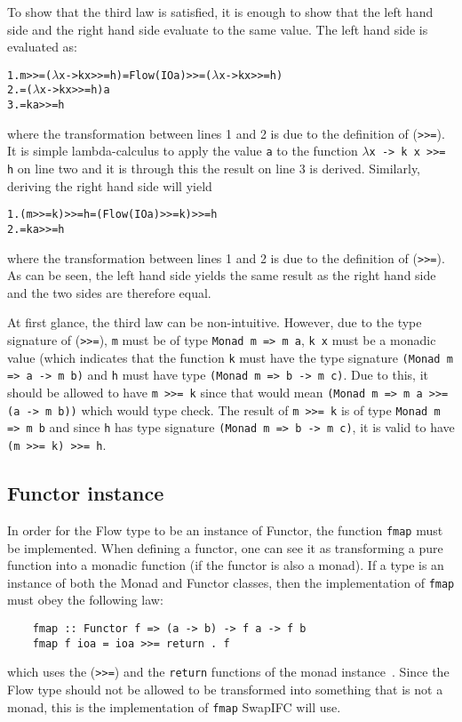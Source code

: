 To show that the third law is satisfied, it is enough to show that the left hand side and the right hand side evaluate to the same value. The left hand side is evaluated as:
\begin{alltt}
  1. m >>= (\(\lambda\)x -> k x >>= h) = Flow (IO a) >>= (\(\lambda\)x -> k x >>= h)
  2.                         = (\(\lambda\)x -> k x >>= h) a
  3.                         = k a >>= h
\end{alltt}
where the transformation between lines 1 and 2 is due to the definition of ({\tt >>=}). It is simple lambda-calculus to apply the value {\tt a} to the function {\tt \(\lambda\)x -> k x >>= h} on line two and it is through this the result on line 3 is derived.
\newline
\newline
Similarly, deriving the right hand side will yield
\begin{alltt}
  1. (m >>= k) >>= h = (Flow (IO a) >>= k) >>= h
  2.                 = k a >>= h
\end{alltt}
where the transformation between lines 1 and 2 is due to the definition of ({\tt >>=}). As can be seen, the left hand side yields the same result as the right hand side and the two sides are therefore equal.

At first glance, the third law can be non-intuitive. However, due to the type signature of ({\tt >>=}), {\tt m} must be of type {\tt Monad m => m a}, {\tt k x} must be a monadic value (which indicates that the function {\tt k} must have the type signature {\tt (Monad m => a -> m b)} and {\tt h} must have type {\tt (Monad m => b -> m c)}. Due to this, it should be allowed to have {\tt m >>= k} since that would mean {\tt (Monad m => m a >>= (a -> m b))} which would type check. The result of {\tt m >>= k} is of type {\tt Monad m => m b} and since {\tt h} has type signature {\tt (Monad m => b -> m c)}, it is valid to have {\tt (m >>= k) >>= h}.
\subsection{Functor instance}
In order for the Flow type to be an instance of Functor, the function {\tt fmap} must be implemented. When defining a functor, one can see it as transforming a pure function into a monadic function (if the functor is also a monad). If a type is an instance of both the Monad and Functor classes, then the implementation of {\tt fmap} must obey the following law:
\begin{verbatim}
    fmap :: Functor f => (a -> b) -> f a -> f b
    fmap f ioa = ioa >>= return . f
\end{verbatim}
which uses the ({\tt >>=}) and the {\tt return} functions of the monad instance~\cite{functor-monad-law}. Since the Flow type should not be allowed to be transformed into something that is not a monad, this is the implementation of {\tt fmap} SwapIFC will use.
